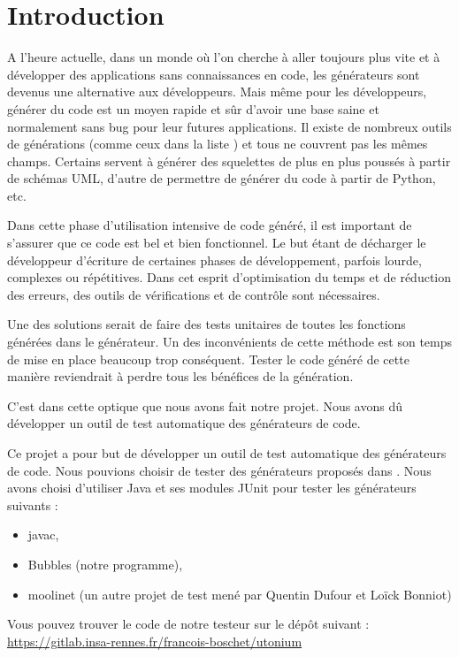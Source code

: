 \chapter*{Introduction}

A l'heure actuelle, dans un monde où l'on cherche à aller toujours plus vite et à développer des applications sans connaissances en code, les générateurs sont devenus une alternative aux développeurs. Mais même pour les développeurs, générer du code est un moyen rapide et sûr d'avoir une base saine et normalement sans bug pour leur futures applications. Il existe de nombreux outils de générations (comme ceux dans la liste \cite{liste_generateurs}) et tous ne couvrent pas les mêmes champs. Certains servent à générer des squelettes de plus en plus poussés à partir de schémas UML, d'autre de permettre de générer du code \jv à partir de Python, etc.

Dans cette phase d'utilisation intensive de code généré, il est important de s'assurer que ce code est bel et bien fonctionnel. Le but étant de décharger le développeur d'écriture de certaines phases de développement, parfois lourde, complexes ou répétitives. Dans cet esprit d'optimisation du temps et de réduction des erreurs, des outils de vérifications et de contrôle sont nécessaires.

Une des solutions serait de faire des tests unitaires de toutes les fonctions générées dans le générateur. Un des inconvénients de cette méthode est son temps de mise en place beaucoup trop conséquent. Tester le code généré de cette manière reviendrait à perdre tous les bénéfices de la génération.

C'est dans cette optique que nous avons fait notre projet. Nous avons dû développer un outil de test automatique des générateurs de code.

\hspace{15pt}


Ce projet a pour but de développer un outil de test automatique des générateurs de code. Nous pouvions choisir de tester des générateurs proposés dans \cite{liste_generateurs}. Nous avons choisi d'utiliser Java et ses modules JUnit pour tester les générateurs suivants :

\begin{itemize}
    \item javac,
    \item Bubbles (notre programme),
    \item moolinet \cite{moolinet}(un autre projet de test mené par Quentin Dufour et Loïck Bonniot)
\end{itemize}

Vous pouvez trouver le code de notre testeur sur le dépôt suivant :
\url{https://gitlab.insa-rennes.fr/francois-boschet/utonium}
